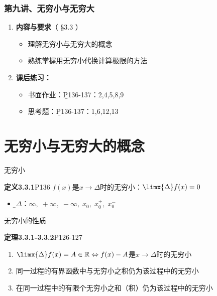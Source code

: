 \begin{frame}
	\frametitle{第九讲、无穷小与无穷大}
	\linespread{1.5}
	\begin{enumerate}
	  \item {\bf 内容与要求}{\color{blue}（ \S3.3 ）}
	  \begin{itemize}
	    \item 理解无穷小与无穷大的概念
	    \item 熟练掌握用无穷小代换计算极限的方法
	  \vspace{1em}
	  \end{itemize}
	  \item {\bf 课后练习：}
	  \begin{itemize}
	    \item 书面作业：{\b P136-137：2,4,5,8,9}
	    \item 思考题：{\b P136-137：1,6,12,13}
	  \end{itemize}
	\end{enumerate}
\end{frame}

\section{无穷小与无穷大的概念}

\begin{frame}{无穷小}
	\linespread{1.5}\pause 
	\begin{block}{{\bf 定义3.3.1}\hfill P136}
		{\bb $f(x)$是$x\to\Delta$时的无穷小：}$\limx{\Delta}f(x)=0$
	\end{block}\pause 
	\begin{itemize}
	  \item {\b $\Delta$：}$\infty,\;+\infty,\;-\infty,\;x_0,\;x_0^+,\;x_0^-$
	\end{itemize}
\end{frame}

\begin{frame}{无穷小的性质}
	\linespread{1.5}\pause 
	\begin{block}{{\bf 定理3.3.1-3.3.2}\hfill P126-127}
		\begin{enumerate}
		  \item $\limx{\Delta}f(x)=A\in\mathbb{R}\Leftrightarrow
		  f(x)-A$是$x\to\Delta$时的无穷小\pause 
		  \item 同一过程的有界函数中与无穷小之积仍为该过程中的无穷小\pause 
		  \item {\alert{在同一过程中的有限个无穷小之和（积）仍为该过程中的无穷小}}
		\end{enumerate}
	\end{block}
\end{frame}

